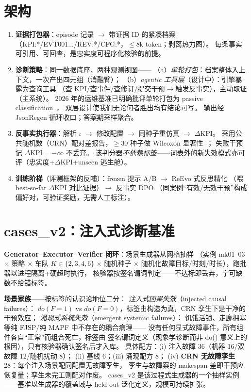\documentclass[UTF8,12pt,a4paper]{ctexart}
\begin{document}
\section{架构}\label{sec:arch}

\begin{enumerate}
  \item \textbf{证据打包器}：episode 记录 $\to$ 带证据 ID 的紧凑档案
    （KPI:*/EVT001.../REV:*/CFG:*，$\le$8k token；剥离热力图）。
    每条事实可引用、可回查，是忠实度可程序化核验的前提。
  \item \textbf{诊断策略}：同一数据底座、两种观测视图——
    （a）\emph{单轮打包}：档案整体入上下文，一次产出四元组（消融臂）；
    （b）\emph{agentic 工具层}（设计中）：引擎暴露为查询工具
    （查 KPI/查事件/查修订/提交干预$\to$触发反事实），主动取证（主系统）。
    2026 年的运维基准已明确批评单轮打包为 passive classification~\cite{cloudopsbench2026}，
    双层设计使我们无论何者胜出均有结论可写。
    输出经 JsonRegen 循环收口；答案期采样聚合。
  \item \textbf{反事实执行器}：解析 $\iota$ $\to$ 修改配置 $\to$ 同种子重仿真 $\to$ $\Delta$KPI。
    采用公共随机数（CRN）配对差报告，$\ge$30 种子做 Wilcoxon 显著性~\cite{crn2024}；
    失败干预记 $\Delta$KPI$=-\infty$ 不丢弃。
    该判分器\emph{不依赖标签}——词表外的新失效模式亦可评（忠实度+$\Delta$KPI+unseen 逃生舱）。
  \item \textbf{训练阶梯}（评测框架的反哺）：frozen 提示 A/B $\to$ ReEvo 式反思精化
    （喂 best-so-far $\Delta$KPI 对比证据）$\to$ 反事实 DPO
    （同案例``有效/无效干预''构成偏好对，可验证奖励，无需人工标注）。
\end{enumerate}

\section{cases\_v2：注入式诊断基准}\label{sec:data}

\textbf{Generator--Executor--Verifier 闭环}：场景生成器从网格抽样
（实例 mk01--03 $\times$ 策略 $\times$ 车队 $K\in\{2,3,4,6\}$ $\times$ 随机种子
$\times$ 随机化故障目标/时刻/时长），跑批器以进程隔离+硬超时执行，
核验器按签名谓词判定——不达标即丢弃，宁可缺数不给错标签。

\textbf{场景家族}——按标签的认识论地位二分：
\emph{注入式因果失效}（injected causal failures）：
$do(F{=}1)$ vs $do(F{=}0)$，标签由构造为真，CRN 孪生下是干净的干预效应；
\emph{涌现式系统失效}（emergent systemic failures）：
饥饿活锁、走廊拥塞等纯 FJSP/纯 MAPF 中不存在的耦合病理——
没有任何显式故障事件，所有组件各自``正常''而组合死亡，标签由
签名谓词定义（现象学诊断而非 do() 意义上的根因），只有核验器确认签名后才入库。
具体配方：(i) 注入故障 36（机器 16/双故障 12/随机扰动 8）；
(ii) 基线 6；(iii) 涌现配方 8；
(iv) \textbf{CRN 无故障孪生} 28：每个注入场景配同配置无故障孪生，
孪生与故障案的 makespan 差即干预应恢复量；孪生未完工则配对作废。
cases\_v2 是该过程式生成器的一个抽样实例——基准以生成器的覆盖域与
held-out 泛化定义，规模可持续扩张。
\end{document}
